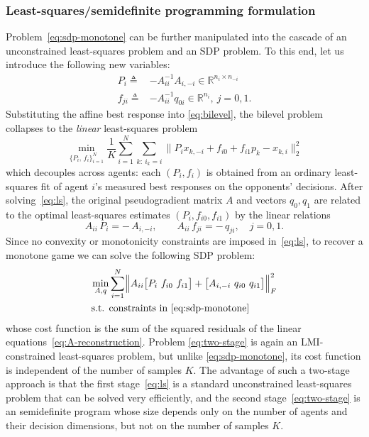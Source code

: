 \documentclass[11pt, a4paper]{article}
\newcommand{\rr}{\mathbb{R}}
\theoremstyle{remark}
\theoremstyle{plain}
\begin{document}
\subsubsection{Least-squares/semidefinite programming formulation}
Problem~\eqref{eq:sdp-monotone} can be further manipulated into the cascade of an unconstrained least-squares problem and an SDP problem. To this end, let us introduce the following new variables:
\begin{equation}
    \begin{aligned}
    P_i \triangleq &-A_{ii}^{-1} A_{i,-i} \in \rr^{n_i \times n_{-i}}\\
    f_{ji} \triangleq &-A_{ii}^{-1} q_{0i} \in \rr^{n_i}, \ j=0,1.
    \end{aligned}
\end{equation}
Substituting the affine best response into \eqref{eq:bilevel}, the bilevel problem collapses to the \emph{linear} least-squares problem
\begin{equation}
    \min_{\{P_i,\, f_i\}_{i=1}^{N}}
    \frac{1}{K}\sum_{i=1}^{N}\sum_{k:\ i_k=i}
    \bigl\| P_i x_{k,-i} + f_{i0}+f_{i1}p_k - {x}_{k,i} \bigr\|_2^2
    \label{eq:ls}
\end{equation}
which decouples across agents: each $(P_i, f_i)$ is obtained from an ordinary least-squares fit of agent $i$'s measured best responses on the opponents' decisions. After solving~\eqref{eq:ls}, the original pseudogradient matrix $A$ and vectors $q_0,q_1$ are related to the optimal least-squares estimates $(P_i, f_{i0}, f_{i1})$ by the linear relations
\begin{equation}
    A_{ii}\, P_i = -\,A_{i,-i},
    \qquad
    A_{ii}\, f_{ji} = -\,q_{ji}, \quad j=0,1.
    \label{eq:A-reconstruction}
\end{equation}
Since no convexity or monotonicity constraints are imposed in~\eqref{eq:ls}, to recover a monotone game we can solve the following SDP problem:
\begin{equation}
    \begin{aligned}
    \min_{A, q} &
    \sum_{i=1}^{N}
    \Bigl\| A_{ii} \bigl[ P_i\ f_{i0} \ f_{i1} \bigr] + \bigl[ A_{i,-i}\ q_{i0}\ q_{i1} \bigr]  \Bigr\|_F^2\\
    \text{s.t. } & \textrm{constraints in~\eqref{eq:sdp-monotone}}
    \label{eq:two-stage}
    \end{aligned}
\end{equation}
whose cost function is the sum of the squared residuals of the linear equations~\eqref{eq:A-reconstruction}. 
Problem \eqref{eq:two-stage} is again an LMI-constrained least-squares problem, but unlike
\eqref{eq:sdp-monotone}, its cost function is independent of the number of samples $K$.
The advantage of such a two-stage approach is that the first stage~\eqref{eq:ls} is a standard unconstrained least-squares problem that can be solved very efficiently, and the second stage~\eqref{eq:two-stage} is an semidefinite program whose size depends only on the number of agents and their decision dimensions, but not on the number of samples $K$.
\end{document}
